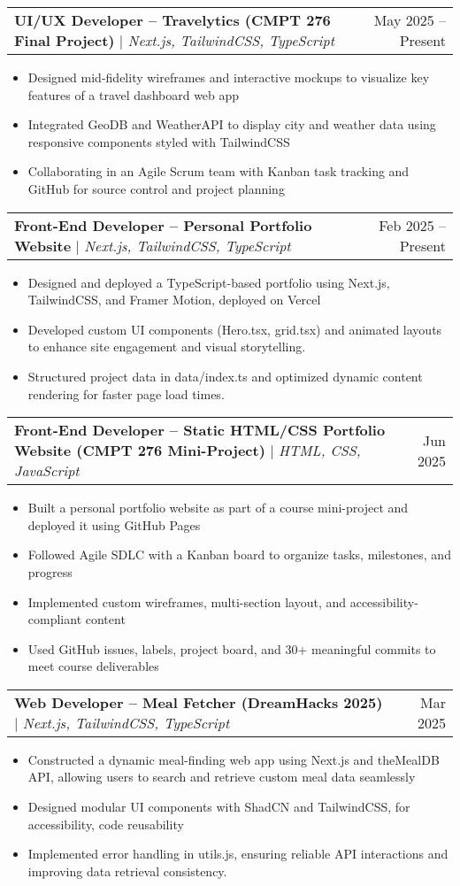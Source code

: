 \documentclass[letterpaper,10pt]{article}
\makeatletter
\newcommand{\resumeItem}[1]{
  \item\small{
    {#1 \vspace{-2pt}}
  }
}
\newcommand{\resumeProjectHeading}[2]{
    \item
    \begin{tabular*}{0.97\textwidth}{l@{\extracolsep{\fill}}r}
      \small#1 & #2 \\
    \end{tabular*}\vspace{-7pt}
}
\newcommand{\resumeItemListStart}{\begin{itemize}}
\newcommand{\resumeItemListEnd}{\end{itemize}\vspace{-5pt}}
\makeatother
\begin{document}
  
    \resumeProjectHeading
        {\textbf{UI/UX Developer – Travelytics (CMPT 276 Final Project)} $|$ \emph{Next.js, TailwindCSS, TypeScript}}{May 2025 -- Present}
        \resumeItemListStart
            \resumeItem{Designed mid-fidelity wireframes and interactive mockups to visualize key features of a travel dashboard web app}
            \resumeItem{Integrated GeoDB and WeatherAPI to display city and weather data using responsive components styled with TailwindCSS}
            \resumeItem{Collaborating in an Agile Scrum team with Kanban task tracking and GitHub for source control and project planning}
    \resumeItemListEnd
    
    \resumeProjectHeading
      {\textbf{Front-End Developer -- Personal Portfolio Website} $|$ \emph{Next.js, TailwindCSS, TypeScript}}{Feb 2025 -- Present}
      \resumeItemListStart
        \resumeItem{Designed and deployed a TypeScript-based portfolio using Next.js, TailwindCSS, and Framer Motion, deployed on Vercel}
        \resumeItem{Developed custom UI components (Hero.tsx, grid.tsx) and animated layouts to enhance site engagement and visual storytelling.}
        \resumeItem{Structured project data in data/index.ts and optimized dynamic content rendering for faster page load times.}
    \resumeItemListEnd

    \resumeProjectHeading
      {\textbf{Front-End Developer – Static HTML/CSS Portfolio Website (CMPT 276 Mini-Project)} $|$ \emph{HTML, CSS, JavaScript}}{Jun 2025}
      \resumeItemListStart
        \resumeItem{Built a personal portfolio website as part of a course mini-project and deployed it using GitHub Pages}
        \resumeItem{Followed Agile SDLC with a Kanban board to organize tasks, milestones, and progress}
        \resumeItem{Implemented custom wireframes, multi-section layout, and accessibility-compliant content}
        \resumeItem{Used GitHub issues, labels, project board, and 30+ meaningful commits to meet course deliverables}
    \resumeItemListEnd

    \resumeProjectHeading
      {\textbf{Web Developer -- Meal Fetcher (DreamHacks 2025)} $|$ \emph{Next.js, TailwindCSS, TypeScript}}{Mar 2025}
      \resumeItemListStart
        \resumeItem{Constructed a dynamic meal-finding web app using Next.js and theMealDB API, allowing users to search and retrieve custom meal data seamlessly}
        \resumeItem{Designed modular UI components with ShadCN and TailwindCSS, for accessibility, code reusability}
        \resumeItem{Implemented error handling in utils.js, ensuring reliable API interactions and improving data retrieval consistency.}
      \resumeItemListEnd
\end{document}
